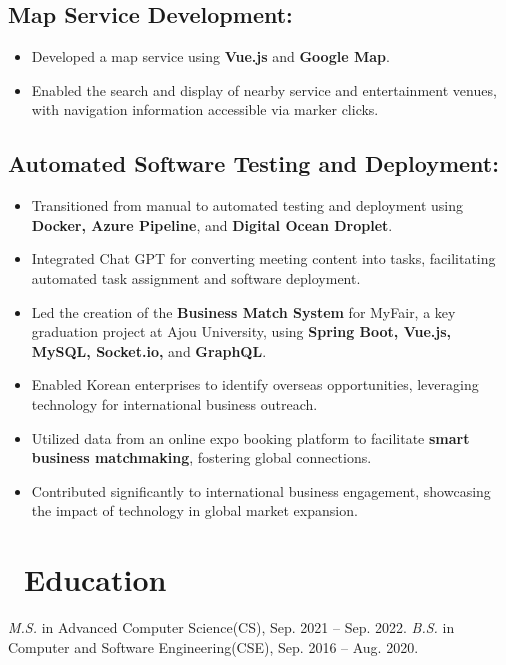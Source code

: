 \documentclass{resume}
\begin{document}
{\small\subsection*{Map Service Development:}}
\begin{itemize}[noitemsep]
    \item Developed a map service using \textbf{Vue.js} and \textbf{Google Map}.
    \item Enabled the search and display of nearby service and entertainment venues, with navigation information accessible via marker clicks.
\end{itemize}
{\small\subsection*{Automated Software Testing and Deployment:}}
\begin{itemize}[noitemsep]
    \item Transitioned from manual to automated testing and deployment using \textbf{Docker, Azure Pipeline}, and \textbf{Digital Ocean Droplet}.
    \item Integrated Chat GPT for converting meeting content into tasks, facilitating automated task assignment and software deployment.
\end{itemize}


\begin{itemize}
  \item Led the creation of the \textbf{Business Match System} for MyFair, a key graduation project at Ajou University, using \textbf{Spring Boot, Vue.js, MySQL, Socket.io,} and \textbf{GraphQL}.
  \item Enabled Korean enterprises to identify overseas opportunities, leveraging technology for international business outreach.
  \item Utilized data from an online expo booking platform to facilitate \textbf{smart business matchmaking}, fostering global connections.
  \item Contributed significantly to international business engagement, showcasing the impact of technology in global market expansion.
\end{itemize}


\section{\faGraduationCap\ Education}
\textit{M.S.} in Advanced Computer Science(CS), Sep. 2021 -- Sep. 2022.
\textit{B.S.} in Computer and Software Engineering(CSE), Sep. 2016 -- Aug. 2020.
\end{document}
